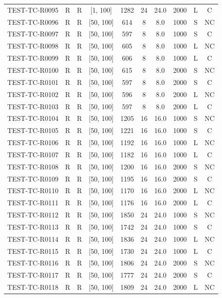 \begin{longtable}{lccccccccc}
TEST-TC-R0095 & R & R & [1, 100] & 1282 & 24 & 24.0 & 2000 & L & C \\
TEST-TC-R0096 & R & R & [50, 100] & 614 & 8 & 8.0 & 1000 & S & NC \\
TEST-TC-R0097 & R & R & [50, 100] & 597 & 8 & 8.0 & 1000 & S & C \\
TEST-TC-R0098 & R & R & [50, 100] & 605 & 8 & 8.0 & 1000 & L & NC \\
TEST-TC-R0099 & R & R & [50, 100] & 606 & 8 & 8.0 & 1000 & L & C \\
TEST-TC-R0100 & R & R & [50, 100] & 615 & 8 & 8.0 & 2000 & S & NC \\
TEST-TC-R0101 & R & R & [50, 100] & 597 & 8 & 8.0 & 2000 & S & C \\
TEST-TC-R0102 & R & R & [50, 100] & 596 & 8 & 8.0 & 2000 & L & NC \\
TEST-TC-R0103 & R & R & [50, 100] & 597 & 8 & 8.0 & 2000 & L & C \\
TEST-TC-R0104 & R & R & [50, 100] & 1205 & 16 & 16.0 & 1000 & S & NC \\
TEST-TC-R0105 & R & R & [50, 100] & 1221 & 16 & 16.0 & 1000 & S & C \\
TEST-TC-R0106 & R & R & [50, 100] & 1192 & 16 & 16.0 & 1000 & L & NC \\
TEST-TC-R0107 & R & R & [50, 100] & 1182 & 16 & 16.0 & 1000 & L & C \\
TEST-TC-R0108 & R & R & [50, 100] & 1200 & 16 & 16.0 & 2000 & S & NC \\
TEST-TC-R0109 & R & R & [50, 100] & 1195 & 16 & 16.0 & 2000 & S & C \\
TEST-TC-R0110 & R & R & [50, 100] & 1170 & 16 & 16.0 & 2000 & L & NC \\
TEST-TC-R0111 & R & R & [50, 100] & 1176 & 16 & 16.0 & 2000 & L & C \\
TEST-TC-R0112 & R & R & [50, 100] & 1850 & 24 & 24.0 & 1000 & S & NC \\
TEST-TC-R0113 & R & R & [50, 100] & 1742 & 24 & 24.0 & 1000 & S & C \\
TEST-TC-R0114 & R & R & [50, 100] & 1836 & 24 & 24.0 & 1000 & L & NC \\
TEST-TC-R0115 & R & R & [50, 100] & 1730 & 24 & 24.0 & 1000 & L & C \\
TEST-TC-R0116 & R & R & [50, 100] & 1806 & 24 & 24.0 & 2000 & S & NC \\
TEST-TC-R0117 & R & R & [50, 100] & 1777 & 24 & 24.0 & 2000 & S & C \\
TEST-TC-R0118 & R & R & [50, 100] & 1809 & 24 & 24.0 & 2000 & L & NC \\

\end{longtable}
